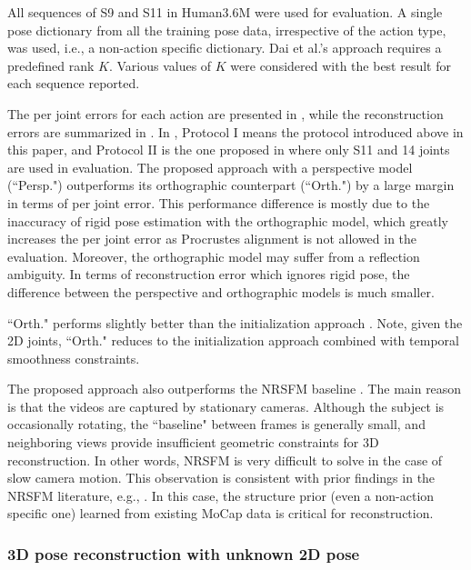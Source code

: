 All sequences of S9 and S11 in Human3.6M were used for evaluation. A single pose dictionary from all the training pose data, irrespective of the action type, was used, i.e., a non-action specific dictionary. Dai et al.'s approach \cite{dai2012simple} requires a predefined rank $K$.  Various values of $K$ were considered with the best result for each sequence reported.

The per joint errors for each action are presented in , while the reconstruction errors are summarized in . In , Protocol I means the protocol introduced above in this paper, and Protocol II is the one proposed in \cite{yasin2016dual} where only S11 and 14 joints are used in evaluation. The proposed approach  with a perspective model (``Persp.") outperforms its orthographic counterpart (``Orth.") by a large margin in terms of per joint error.
This performance difference is mostly due to the inaccuracy of rigid pose estimation with the orthographic model, which greatly increases the per joint error as Procrustes alignment is not allowed in the evaluation. Moreover, the orthographic model may suffer from a reflection ambiguity.  
In terms of reconstruction error which ignores rigid pose, the difference between the perspective and orthographic models is much smaller.

``Orth." performs slightly better than the initialization approach \cite{zhou2015sparse}. Note, given the 2D joints, 
``Orth." reduces to the initialization approach 
combined with temporal smoothness constraints.

The proposed approach also outperforms the NRSFM baseline  \cite{dai2012simple}. The main reason is that the videos are captured by stationary cameras. Although the subject is occasionally rotating, the ``baseline" between frames is generally small, and neighboring views provide insufficient geometric constraints for 3D reconstruction. In other words, NRSFM is very difficult to solve in the case of slow camera motion. This observation is consistent with prior findings in the NRSFM literature, e.g., \cite{akhter2011trajectory}. In this case, the structure prior (even a non-action specific one) learned from existing MoCap data is critical for reconstruction.

\subsubsection{3D pose reconstruction with unknown 2D pose}

